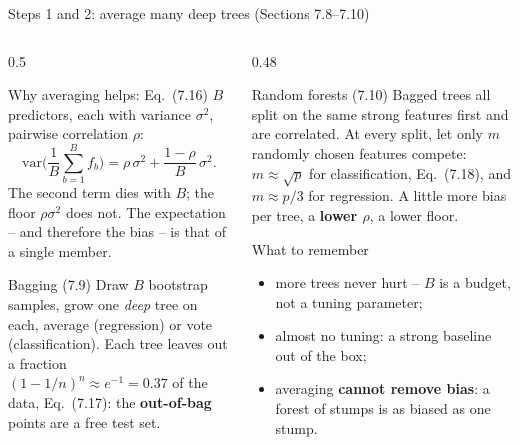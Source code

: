 \documentclass[10pt,aspectratio=169]{beamer}
\newcommand{\var}{\mathrm{var}}
\begin{document}
\begin{frame}{Steps 1 and 2: average many deep trees (Sections 7.8--7.10)}
\begin{columns}[T]
\begin{column}{0.5\textwidth}
\footnotesize
\begin{block}{Why averaging helps: Eq.\ (7.16)}
$B$ predictors, each with variance $\sigma^2$, pairwise correlation $\rho$:
\[
\var\Big(\frac1B\sum_{b=1}^Bf_b\Big)=\rho\,\sigma^2+\frac{1-\rho}{B}\,\sigma^2 .
\]
The second term dies with $B$; the floor $\rho\sigma^2$ does not.  The
expectation -- and therefore the bias -- is that of a single member.
\end{block}
\begin{block}{Bagging (7.9)}
Draw $B$ bootstrap samples, grow one \emph{deep} tree on each, average
(regression) or vote (classification).  Each tree leaves out a fraction
$(1-1/n)^n\approx e^{-1}=0.37$ of the data, Eq.\ (7.17): the
\textbf{out-of-bag} points are a free test set.
\end{block}
\end{column}
\begin{column}{0.48\textwidth}
\footnotesize
\begin{block}{Random forests (7.10)}
Bagged trees all split on the same strong features first and are
correlated.  At every split, let only $m$ randomly chosen features compete:
$m\approx\sqrt{p}$ for classification, Eq.\ (7.18), and $m\approx p/3$ for
regression.  A little more bias per tree, a \textbf{lower $\rho$}, a lower
floor.
\end{block}
\begin{block}{What to remember}
\begin{itemize}
  \item more trees never hurt -- $B$ is a budget, not a tuning parameter;
  \item almost no tuning: a strong baseline out of the box;
  \item averaging \textbf{cannot remove bias}: a forest of stumps is as
    biased as one stump.
\end{itemize}
\end{block}
\end{column}
\end{columns}
\end{frame}
\end{document}
